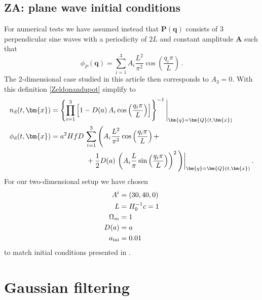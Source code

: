 \documentclass[twocolumn, nofootinbib, showpacs, superscriptaddress]{revtex4-1}
\renewcommand{\d}[0]{{\rm{d}}}
\renewcommand{\v}[1]{\bm{#1} }
\newcommand{\vx}[0]{\bm{x} }
\newcommand{\vq}[0]{\bm{q} }
\newcommand{\vQ}[0]{\bm{Q} }
\begin{document}
\subsection{ZA: plane wave initial conditions} \label{sec:ZAplanewave}
For numerical  tests we have assumed instead that $\v{P}(\vq)$ consists of 3 perpendicular sine waves with a periodicity of $2L$ and constant amplitude $\v{A}$ such that
\begin{equation}
 \phi_P(\vq)=  \sum_{i=1}^3 A_i  \frac{L^2}  {\pi^2}\cos\left( \frac{q_i \pi}{L} \right) \,.
\end{equation}
The 2-dimensional case studied in this article then corresponds to $A_3=0$.
 With this definition \eqref{Zeldonandupot} simplify to
\begin{align}
n_\d(t,\vx)  &= \left\{ \prod_{i=1}^3 \left[ 1- D(a)\, A_i \cos\left( \frac{q_i \pi}{L} \right)   \right]  \right\}^{-1} \Bigg|_{\vq = \vQ(t,\vx)} \\
 \phi_\d(t,\vx)&  = a^2 H f D\, \sum_{i=1}^3 \Bigg( A_i  \frac{L^2}  {\pi^2}\cos\left( \frac{q_i \pi}{L} \right) +  \\
 & \qquad \qquad \quad + \frac{1}{2} D(a)\, \left( A_i  \frac{L}  {\pi}\sin\left( \frac{q_i \pi}{L} \right)  \right)^2 \Bigg) \bigg|_{\vq = \vQ(t,\vx)} \notag\,.
 \end{align}
 For our two-dimensional setup we have chosen
\begin{align}
A^i&=(30,40,0) \\
L &= H^{-1}_0 c= 1\\
\Omega_m &= 1 \\
D(a) &= a \\
a_{\rm ini} &=0.01
\end{align}
to match initial conditions presented in \cite{SousbieColombi2016}.

\section{Gaussian filtering}
\label{sec:numericalimplementation}
\end{document}
